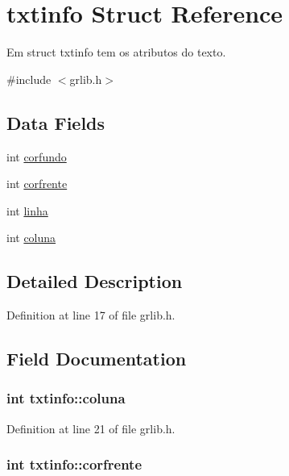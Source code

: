 \hypertarget{structtxtinfo}{
\section{txtinfo Struct Reference}
\label{structtxtinfo}
}


Em struct txtinfo tem os atributos do texto.  




{\ttfamily \#include $<$grlib.h$>$}

\subsection*{Data Fields}
\begin{DoxyCompactItemize}
\item 
int \hyperlink{structtxtinfo_a4991aeaa1a7cf13a6d6a46ac7a7e507b}{corfundo}
\item 
int \hyperlink{structtxtinfo_a466f5cf2246da39cdec99694deb08168}{corfrente}
\item 
int \hyperlink{structtxtinfo_a868126026d58a5c3da00710f057a610d}{linha}
\item 
int \hyperlink{structtxtinfo_a4ac79eae210fb56e531d9cbb56dbb63a}{coluna}
\end{DoxyCompactItemize}


\subsection{Detailed Description}


Definition at line 17 of file grlib.h.



\subsection{Field Documentation}
\hypertarget{structtxtinfo_a4ac79eae210fb56e531d9cbb56dbb63a}{
\subsubsection[{coluna}]{\setlength{\rightskip}{0pt plus 5cm}int {\bf txtinfo::coluna}}}
\label{structtxtinfo_a4ac79eae210fb56e531d9cbb56dbb63a}


Definition at line 21 of file grlib.h.

\hypertarget{structtxtinfo_a466f5cf2246da39cdec99694deb08168}{
\subsubsection[{corfrente}]{\setlength{\rightskip}{0pt plus 5cm}int {\bf txtinfo::corfrente}}}
\label{structtxtinfo_a466f5cf2246da39cdec99694deb08168}


